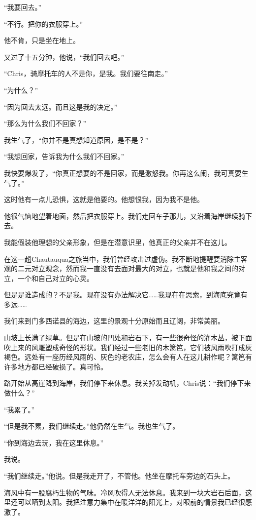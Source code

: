 \documentclass[UTF8]{article}
\begin{document}
\par “我要回去。”
\par “不行。把你的衣服穿上。”
\par 他不肯，只是坐在地上。
\par 又过了十五分钟，他说，“我们回去吧。”
\par “Chris，骑摩托车的人不是你，是我。我们要往南走。”
\par “为什么？”
\par “因为回去太远。而且这是我的决定。”
\par “那么为什么我们不回家？”
\par 我生气了，“你并不是真想知道原因，是不是？”
\par “我想回家，告诉我为什么我们不回家。”
\par 我快要爆发了，“你真正想要的不是回家，而是激怒我。你再这么闹，我可真要生气了。”
\par 这时他有一点儿恐惧，这就是他要的。他想恨我，因为我不是他。
\par 他很气恼地望着地面，然后把衣服穿上。我们走回车子那儿，又沿着海岸继续骑下去。
\par 我能假装他理想的父亲形象，但是在潜意识里，他真正的父亲并不在这儿。
\par 在这一趟Chautauqua之旅当中，我们曾经攻击过虚伪。我不断地提醒要消除主客观的二元对立观念，然而我一直没有去面对最大的对立，也就是他和我之间的对立，一个和自己对立的心灵。
\par 但是是谁造成的？不是我。现在没有办法解决它……我现在在思索，到海底究竟有多远……
\par 我们来到门多西诺县的海边，这里的景观十分原始而且辽阔，非常美丽。
\par 山坡上长满了绿草。但是在山坡的凹处和岩石下，有一些很奇怪的灌木丛，被下面吹上来的风雕塑成奇怪的形状。我们经过一些老旧的木篱笆，它们被风雨吹打成灰褐色。远处有一座历经风雨的、灰色的老农庄，怎么会有人在这儿耕作呢？篱笆有许多地方都已经破损了。真可怜。
\par 路开始从高崖降到海岸，我们停下来休息。我关掉发动机，Chris说：“我们停下来做什么？”
\par “我累了。”
\par “但是我不累，我们继续走。”他仍然在生气。我也生气了。
\par “你到海边去玩，我在这里休息。”
\par 我说。
\par “我们继续走。”他说。但是我走开了，不管他。他坐在摩托车旁边的石头上。
\par 海风中有一股腐朽生物的气味。冷风吹得人无法休息。我来到一块大岩石后面，这里还可以晒到太阳。我把注意力集中在暖洋洋的阳光上，对眼前的情景我已经很感激了。
\end{document}
